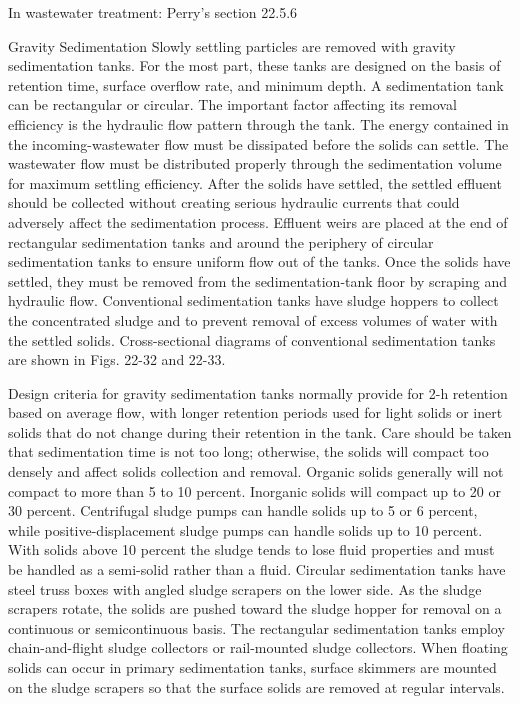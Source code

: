 In wastewater treatment: Perry's section 22.5.6

Gravity Sedimentation Slowly settling particles are removed with gravity sedimentation tanks. For the most part, these tanks are designed on the basis of retention time, surface overflow rate, and minimum depth. A sedimentation tank can be rectangular or circular. The important factor affecting its removal efficiency is the hydraulic flow pattern through the tank. The energy contained in the incoming-wastewater flow must be dissipated before the solids can settle. The wastewater flow must be distributed properly through the sedimentation volume for maximum settling efficiency. After the solids have settled, the settled effluent should be collected without creating serious hydraulic currents that could adversely affect the sedimentation process. Effluent weirs are placed at the end of rectangular sedimentation tanks and around the periphery of circular sedimentation tanks to ensure uniform flow out of the tanks. Once the solids have settled, they must be removed from the sedimentation-tank floor by scraping and hydraulic flow. Conventional sedimentation tanks have sludge hoppers to collect the concentrated sludge and to prevent removal of excess volumes of water with the settled solids. Cross-sectional diagrams of conventional sedimentation tanks are shown in Figs. 22-32 and 22-33.

Design criteria for gravity sedimentation tanks normally provide for 2-h retention based on average flow, with longer retention periods used for light solids or inert solids that do not change during their retention in the tank. Care should be taken that sedimentation time is not too long; otherwise, the solids will compact too densely and affect solids collection and removal. Organic solids generally will not compact to more than 5 to 10 percent. Inorganic solids will compact up to 20 or 30 percent. Centrifugal sludge pumps can handle solids up to 5 or 6 percent, while positive-displacement sludge pumps can handle solids up to 10 percent. With solids above 10 percent the sludge tends to lose fluid properties and must be handled as a semi-solid rather than a fluid. Circular sedimentation tanks have steel truss boxes with angled sludge scrapers on the lower side. As the sludge scrapers rotate, the solids are pushed toward the sludge hopper for removal on a continuous or semicontinuous basis. The rectangular sedimentation tanks employ chain-and-flight sludge collectors or rail-mounted sludge collectors. When floating solids can occur in primary sedimentation tanks, surface skimmers are mounted on the sludge scrapers so that the surface solids are removed at regular intervals.


